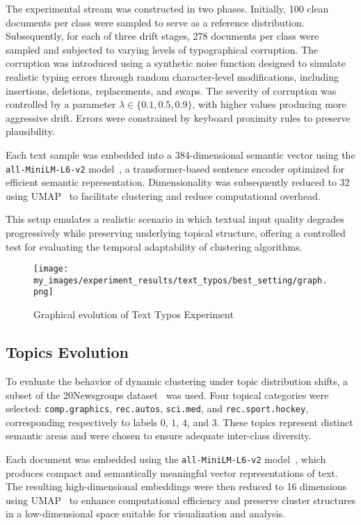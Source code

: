 The experimental stream was constructed in two phases. Initially, 100 clean
documents per class were sampled to serve as a reference distribution.
Subsequently, for each of three drift stages, 278 documents per class were
sampled and subjected to varying levels of typographical corruption. The
corruption was introduced using a synthetic noise function designed to simulate
realistic typing errors through random character-level modifications, including
insertions, deletions, replacements, and swaps. The severity of corruption was
controlled by a parameter $\lambda \in \{0.1, 0.5, 0.9\}$, with higher values
producing more aggressive drift. Errors were constrained by keyboard proximity
rules to preserve plausibility.

Each text sample was embedded into a 384-dimensional semantic vector using the
\texttt{all\allowbreak-MiniLM\allowbreak-L6\allowbreak-v2}
model~\cite{sentence-transformers}, a transformer-based sentence encoder
optimized for efficient semantic representation. Dimensionality was
subsequently reduced to 32 using UMAP~\cite{umap} to facilitate clustering and
reduce computational overhead.

This setup emulates a realistic scenario in which textual input quality
degrades progressively while preserving underlying topical structure, offering
a controlled test for evaluating the temporal adaptability of clustering
algorithms.

\begin{figure}[h]
      \centering
      \texttt{[image: my\_images/experiment\_results/text\_typos/best\_setting/graph.png]}
      \caption{Graphical evolution of Text Typos Experiment}
\end{figure}

\subsection{Topics Evolution}\label{subsec:topics_evolution}

To evaluate the behavior of dynamic clustering under topic distribution shifts,
a subset of the 20Newsgroups dataset~\cite{20newsgroups} was used. Four topical
categories were selected: \texttt{comp.graphics}, \texttt{rec.autos},
\texttt{sci.med}, and \texttt{rec.sport.hockey}, corresponding respectively to
labels $0$, $1$, $4$, and $3$. These topics represent distinct semantic areas
and were chosen to ensure adequate inter-class diversity.

Each document was embedded using the
\texttt{all\allowbreak-MiniLM\allowbreak-L6\allowbreak-v2}
model~\cite{sentence-transformers}, which produces compact and semantically
meaningful vector representations of text. The resulting high-dimensional
embeddings were then reduced to 16 dimensions using UMAP~\cite{umap} to enhance
computational efficiency and preserve cluster structures in a low-dimensional
space suitable for visualization and analysis.

